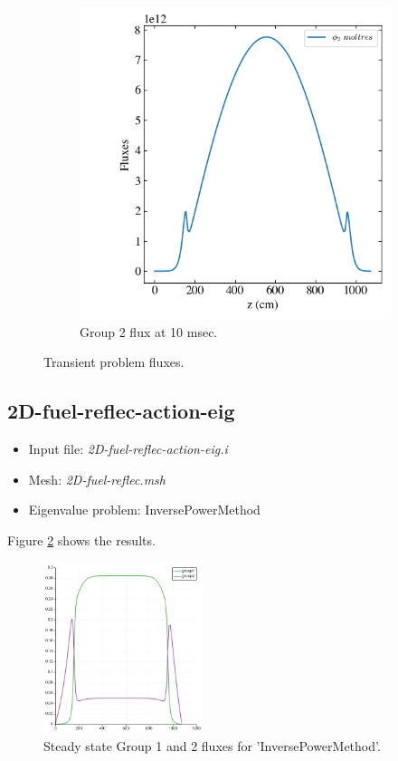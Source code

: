 \documentclass[11pt,letterpaper]{article}
\begin{document}
\begin{figure}[htbp!]
\begin{subfigure}[t]{0.4\textwidth}
			\includegraphics[width=\linewidth]{2D-fuel-reflec-action-delayed-g2}
			\caption{Group 2 flux at 10 msec.}
		\end{subfigure}
		\hfill
		\caption{Transient problem fluxes.}
		\label{fig:2D-fuel-reflec-action-delayed}
	\end{figure}

\subsection{2D-fuel-reflec-action-eig}

	\begin{itemize}
		\item Input file: \textit{2D-fuel-reflec-action-eig.i}
		\item Mesh: \textit{2D-fuel-reflec.msh}
		\item Eigenvalue problem: InversePowerMethod
	\end{itemize}

Figure \ref{fig:2D-fuel-reflec-action-eig} shows the results.

	\begin{figure}[htbp!]
		\centering
		\includegraphics[height=5cm]{2D-fuel-reflec-action-eig}
		\caption{Steady state Group 1 and 2 fluxes for 'InversePowerMethod'.}
		\label{fig:2D-fuel-reflec-action-eig}
	\end{figure}

\pagebreak

% 
\end{document}
